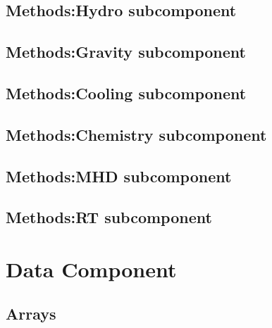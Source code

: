 \subsection{Methods:Hydro subcomponent}

\subsection{Methods:Gravity subcomponent}

\subsection{Methods:Cooling subcomponent}

\subsection{Methods:Chemistry subcomponent}

\subsection{Methods:MHD subcomponent}

\subsection{Methods:RT subcomponent}

\section{Data Component}

\subsection{Arrays}

